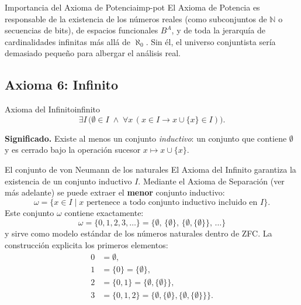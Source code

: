 \begin{observacion}{Importancia del Axioma de Potencia}{imp-pot}
El Axioma de Potencia es responsable de la existencia de los números reales (como subconjuntos de $\mathbb{N}$ o secuencias de bits), de espacios funcionales $B^A$, y de toda la jerarquía de cardinalidades infinitas más allá de $\aleph_0$. Sin él, el universo conjuntista sería demasiado pequeño para albergar el análisis real.
\end{observacion}

\subsection{Axioma 6: Infinito}

\begin{definicion}{Axioma del Infinito}{infinito}
\[
  \exists I\,\bigl(\emptyset \in I \;\wedge\; \forall x\,(x \in I \to x \cup \{x\} \in I)\bigr).
\]
\end{definicion}

\textbf{Significado.} Existe al menos un conjunto \emph{inductivo}: un conjunto que contiene $\emptyset$ y es cerrado bajo la operación sucesor $x \mapsto x \cup \{x\}$.

\begin{ejemplo}{El conjunto de von Neumann de los naturales}{}
El Axioma del Infinito garantiza la existencia de un conjunto inductivo $I$. Mediante el Axioma de Separación (ver más adelante) se puede extraer el \textbf{menor} conjunto inductivo:
\[
  \omega = \{x \in I \mid x \text{ pertenece a todo conjunto inductivo incluido en } I\}.
\]
Este conjunto $\omega$ contiene exactamente:
\[
  \omega = \{0, 1, 2, 3, \ldots\} = \{\emptyset,\, \{\emptyset\},\, \{\emptyset,\{\emptyset\}\},\, \ldots\}
\]
y sirve como modelo estándar de los números naturales dentro de ZFC. La construcción explicita los primeros elementos:
\begin{align*}
  0 &= \emptyset, \\
  1 &= \{0\} = \{\emptyset\}, \\
  2 &= \{0,1\} = \{\emptyset, \{\emptyset\}\}, \\
  3 &= \{0,1,2\} = \{\emptyset, \{\emptyset\}, \{\emptyset,\{\emptyset\}\}\}.
\end{align*}
\end{ejemplo}

